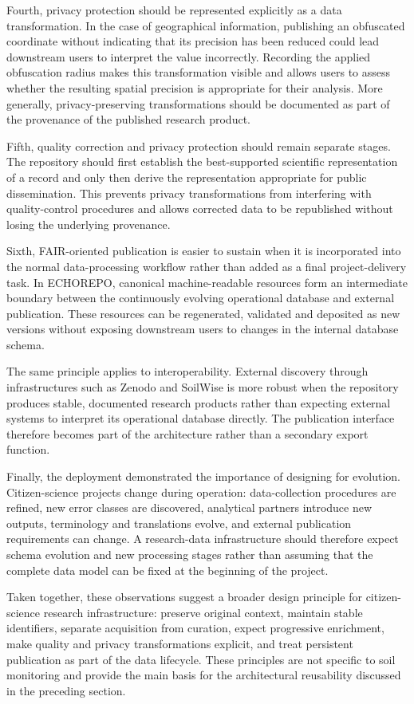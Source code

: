 Fourth, privacy protection should be represented explicitly as a data transformation. In the case of geographical information, publishing an obfuscated coordinate without indicating that its precision has been reduced could lead downstream users to interpret the value incorrectly. Recording the applied obfuscation radius makes this transformation visible and allows users to assess whether the resulting spatial precision is appropriate for their analysis. More generally, privacy-preserving transformations should be documented as part of the provenance of the published research product.

Fifth, quality correction and privacy protection should remain separate stages. The repository should first establish the best-supported scientific representation of a record and only then derive the representation appropriate for public dissemination. This prevents privacy transformations from interfering with quality-control procedures and allows corrected data to be republished without losing the underlying provenance.

Sixth, FAIR-oriented publication is easier to sustain when it is incorporated into the normal data-processing workflow rather than added as a final project-delivery task. In ECHOREPO, canonical machine-readable resources form an intermediate boundary between the continuously evolving operational database and external publication. These resources can be regenerated, validated and deposited as new versions without exposing downstream users to changes in the internal database schema.

The same principle applies to interoperability. External discovery through infrastructures such as Zenodo and SoilWise is more robust when the repository produces stable, documented research products rather than expecting external systems to interpret its operational database directly. The publication interface therefore becomes part of the architecture rather than a secondary export function.

Finally, the deployment demonstrated the importance of designing for evolution. Citizen-science projects change during operation: data-collection procedures are refined, new error classes are discovered, analytical partners introduce new outputs, terminology and translations evolve, and external publication requirements can change. A research-data infrastructure should therefore expect schema evolution and new processing stages rather than assuming that the complete data model can be fixed at the beginning of the project.

Taken together, these observations suggest a broader design principle for citizen-science research infrastructure: preserve original context, maintain stable identifiers, separate acquisition from curation, expect progressive enrichment, make quality and privacy transformations explicit, and treat persistent publication as part of the data lifecycle. These principles are not specific to soil monitoring and provide the main basis for the architectural reusability discussed in the preceding section.